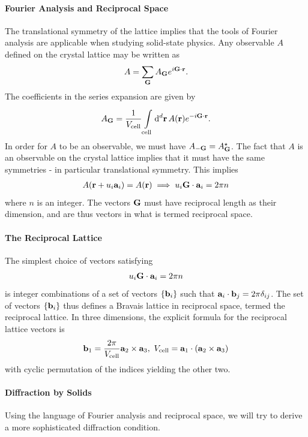 \paragraph{Fourier Analysis and Reciprocal Space}
The translational symmetry of the lattice implies that the tools of Fourier analysis are applicable when studying solid-state physics. Any observable $A$ defined on the crystal lattice may be written as
\begin{align*}
	A = \sum\limits_{\vb{G}}A_{\vb{G}}e^{i\vb{G}\cdot\vb{r}}.
\end{align*}
The coefficients in the series expansion are given by
\begin{align*}
	A_{\vb{G}} = \frac{1}{V_{\text{cell}}}\integ[d]{\text{cell}}{}{\vb{r}}{A(\vb{r})e^{-i\vb{G}\cdot\vb{r}}}.
\end{align*}
In order for $A$ to be an observable, we must have $A_{-\vb{G}} = \cc{A_{\vb{G}}}$. The fact that $A$ is an observable on the crystal lattice implies that it must have the same symmetries - in particular translational symmetry. This implies
\begin{align*}
	A(\vb{r} + u_{i}\vb{a}_{i}) = A(\vb{r}) \implies u_{i}\vb{G}\cdot\vb{a}_{i} = 2\pi n
\end{align*}
where $n$ is an integer. The vectors $\vb{G}$ must have reciprocal length as their dimension, and are thus vectors in what is termed reciprocal space.

\paragraph{The Reciprocal Lattice}
The simplest choice of vectors satisfying
\begin{align*}
	u_{i}\vb{G}\cdot\vb{a}_{i} = 2\pi n
\end{align*}
is integer combinations of a set of vectors $\{\vb{b}_{i}\}$ such that $\vb{a}_{i}\cdot\vb{b}_{j} = 2\pi\delta_{ij}$. The set of vectors $\{\vb{b}_{i}\}$ thus defines a Bravais lattice in reciprocal space, termed the reciprocal lattice. In three dimensions, the explicit formula for the reciprocal lattice vectors is
\begin{align*}
	\vb{b}_{1} = \frac{2\pi}{V_{\text{cell}}}\vb{a}_{2}\times\vb{a}_{3},\ V_{\text{cell}} = \vb{a}_{1}\cdot(\vb{a}_{2}\times\vb{a}_{3})
\end{align*}
with cyclic permutation of the indices yielding the other two.

\paragraph{Diffraction by Solids}
Using the language of Fourier analysis and reciprocal space, we will try to derive a more sophisticated diffraction condition.

